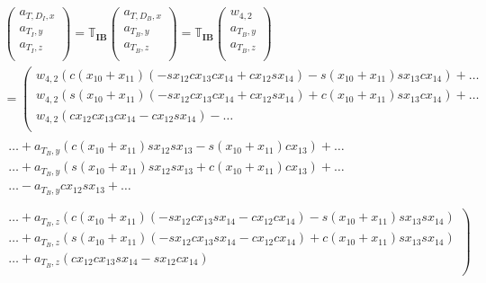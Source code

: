 \begin{multline} \label{eq:DandTInertial}
\begin{pmatrix}
a_{T,D_{I},x}\\
a_{T_{I},y}\\
a_{T_{I},z}\\
\end{pmatrix}
=
\mathbb{T}_{\mathbf{IB}}
\begin{pmatrix}
a_{T,D_{B},x}\\
a_{T_{B},y}\\
a_{T_{B},z}\\
\end{pmatrix}=
\mathbb{T}_{\mathbf{IB}}
\begin{pmatrix}
w_{4,2}\\
a_{T_{B},y}\\
a_{T_{B},z}\\
\end{pmatrix}\\
=
\left(
\begin{matrix}
w_{4,2} \left( c\left(x_{10}+x_{11}\right)\left(-sx_{12} cx_{13} cx_{14} +cx_{12} sx_{14} \right)-s\left(x_{10}+x_{11}\right) sx_{13} cx_{14} \right)  + \dots  \\
w_{4,2} \left( s\left(x_{10}+x_{11}\right)\left(-sx_{12} cx_{13} cx_{14} +cx_{12} sx_{14} \right)+c\left(x_{10}+x_{11}\right) sx_{13} cx_{14}  \right)  + \dots \\
w_{4,2} \left(cx_{12} cx_{13} cx_{14} -cx_{12} sx_{14}  \right)  - \dots \\
\end{matrix} \right.
\\
\begin{matrix}
\dotsc + a_{T_{B},y} \left( c\left(x_{10}+x_{11}\right) sx_{12} sx_{13} -s\left(x_{10}+x_{11}\right) cx_{13}\right) + \dots \\
\dotsc + a_{T_{B},y} \left( s\left(x_{10}+x_{11}\right) sx_{12} sx_{13} +c\left(x_{10}+x_{11}\right) cx_{13} \right) + \dots \\
\dotsc - a_{T_{B},y} cx_{12} sx_{13} + \dots \\
\end{matrix}
\\
\left.
\begin{matrix}
\dotsc + a_{T_{B},z} \left( c\left(x_{10}+x_{11}\right)\left(-sx_{12} cx_{13} sx_{14} -cx_{12} cx_{14} \right)-s\left(x_{10}+x_{11}\right) sx_{13} sx_{14} \right) \\
\dotsc + a_{T_{B},z} \left(s\left(x_{10}+x_{11}\right)\left(-sx_{12} cx_{13} sx_{14} -cx_{12} cx_{14} \right)+c\left(x_{10}+x_{11}\right) sx_{13} sx_{14} \right) \\
\dotsc + a_{T_{B},z} \left( cx_{12} cx_{13} sx_{14} -sx_{12} cx_{14} \right) \\
\end{matrix}
\right)\\
\end{multline}

